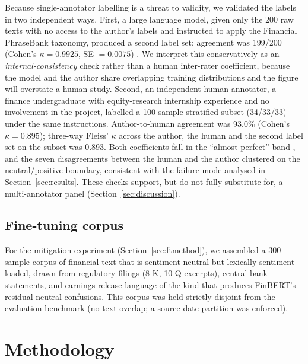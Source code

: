 \documentclass[12pt,a4paper]{article}
\begin{document}
Because single-annotator labelling is a threat to validity, we validated the labels
in two independent ways. First, a large language model, given only the 200 raw
texts with no access to the author's labels and instructed to apply the Financial
PhraseBank taxonomy, produced a second label set; agreement was 199/200 (Cohen's
$\kappa = 0.9925$, SE $= 0.0075$) \citep{cohen1960}. We interpret this conservatively
as an \emph{internal-consistency} check rather than a human inter-rater coefficient,
because the model and the author share overlapping training distributions and the
figure will overstate a human study. Second, an independent human annotator, a
finance undergraduate with equity-research internship experience and no involvement
in the project, labelled a 100-sample stratified subset (34/33/33) under the same
instructions. Author-to-human agreement was 93.0\% (Cohen's $\kappa = 0.895$);
three-way Fleiss' $\kappa$ \citep{fleiss1971} across the author, the human and the
second label set on the subset was 0.893. Both coefficients fall in the ``almost
perfect'' band \citep{landis1977}, and the seven disagreements between the human and
the author clustered on the neutral/positive boundary, consistent with the failure
mode analysed in Section~\ref{sec:results}. These checks support, but do not fully
substitute for, a multi-annotator panel (Section~\ref{sec:discussion}).

\subsection{Fine-tuning corpus}\label{sec:ftcorpus}
For the mitigation experiment (Section~\ref{sec:ftmethod}), we assembled a
300-sample corpus of financial text that is sentiment-neutral but lexically
sentiment-loaded, drawn from regulatory filings (8-K, 10-Q excerpts), central-bank
statements, and earnings-release language of the kind that produces FinBERT's
residual neutral confusions. This corpus was held strictly disjoint from the
evaluation benchmark (no text overlap; a source-date partition was enforced).

\section{Methodology}\label{sec:method}
\end{document}
